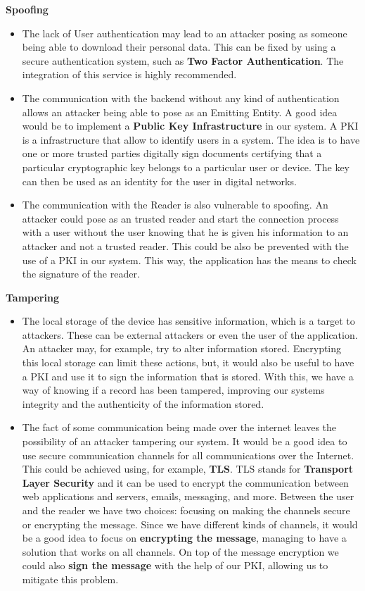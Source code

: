 \textbf{Spoofing}
\begin{itemize}
    \item The lack of User authentication may lead to an attacker posing as someone being able to download their personal data. This can be fixed by using a secure authentication system, such as \textbf{Two Factor Authentication}. The integration of this service is highly recommended.
    
    \item The communication with the backend without any kind of authentication allows an attacker being able to pose as an Emitting Entity. A good idea would be to implement a \textbf{Public Key Infrastructure} in our system. A PKI is a infrastructure that allow to identify users in a system. The idea is to have one or more trusted parties digitally sign documents certifying that a particular cryptographic key belongs to a particular user or device. The key can then be used as an identity for the user in digital networks.\cite{pki}
    
    \item The communication with the Reader is also vulnerable to spoofing. An attacker could pose as an trusted reader and start the connection process with a user without the user knowing that he is given his information to an attacker and not a trusted reader. This could be also be prevented with the use of a PKI\cite{pki} in our system. This way, the application has the means to check the signature of the reader.
\end{itemize}

\textbf{Tampering}
\begin{itemize}
    \item The local storage of the device has sensitive information, which is a target to attackers. These can be external attackers or even the user of the application. An attacker may, for example,  try to alter information stored. Encrypting this local storage can limit these actions, but, it would also be useful to have a PKI\cite{pki} and use it to sign the information that is stored. With this, we have a way of knowing if a record has been tampered, improving our systems integrity and the authenticity of the information stored.
    \item The fact of some communication being made over the internet leaves the possibility of an attacker tampering our system. It would be a good idea to use secure communication channels for all communications over the Internet. This could be achieved using, for example, \textbf{TLS}. TLS stands for \textbf{Transport Layer Security} and it can be used to encrypt the communication between web applications and servers, emails, messaging, and more.\cite{tls} Between the user and the reader we have two choices: focusing on making the channels secure or encrypting the message. Since we have different kinds of channels, it would be a good idea to focus on \textbf{encrypting the message}, managing to have a solution that works on all channels. On top of the message encryption we could also \textbf{sign the message} with the help of our PKI, allowing us to mitigate this problem.
\end{itemize}

